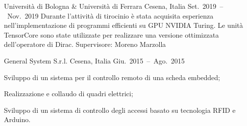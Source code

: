 \begin{cventries}
{        
        {Università di Bologna \& Università di Ferrara}
        {Cesena, Italia}
        {Set.~2019~--~Nov.~2019}
        {
            Durante l'attività di tirocinio è stata acquisita esperienza nell'implementazione di programmi efficienti su GPU NVIDIA Turing.
            Le unità TensorCore sono state utilizzate per realizzare una versione ottimizzata dell'operatore di Dirac.\newline
            Supervisore: Moreno Marzolla
        }

        {General System S.r.l.}
        {Cesena, Italia}
        {Giu.~2015~--~Ago.~2015}
        {
            \begin{cvitems}
                \item {Sviluppo di un sistema per il controllo remoto di una scheda embedded;}
                \item {Realizzazione e collaudo di quadri elettrici;}
                \item {Sviluppo di un sistema di controllo degli accessi basato su tecnologia RFID e Arduino.}
            \end{cvitems}
        }
    }
\end{cventries}